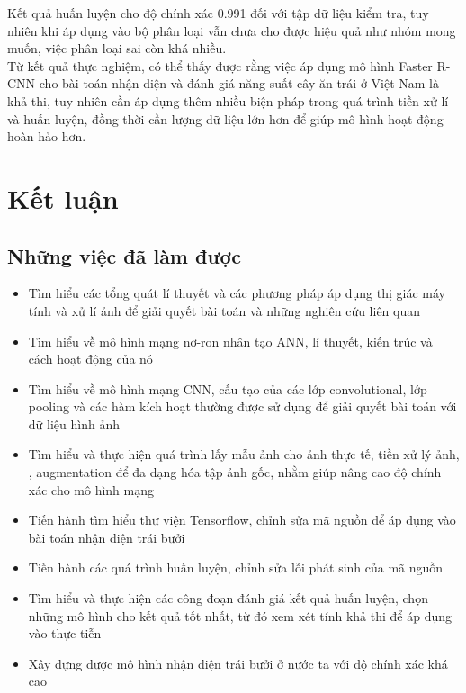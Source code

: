Kết quả huấn luyện cho độ chính xác 0.991 đối với tập dữ liệu kiểm tra, tuy nhiên khi áp dụng vào bộ phân loại vẫn chưa cho được hiệu quả như nhóm mong muốn, việc phân loại sai còn khá nhiều.\\
Từ kết quả thực nghiệm, có thể thấy được rằng việc áp dụng mô hình Faster R-CNN cho bài toán nhận diện và đánh giá năng suất cây ăn trái ở Việt Nam là khả thi, tuy nhiên cần áp dụng thêm nhiều biện pháp trong quá trình tiền xử lí và huấn luyện, đồng thời cần lượng dữ liệu lớn hơn để giúp mô hình hoạt động hoàn hảo hơn.
\section{Kết luận}
\subsection{Những việc đã làm được}
\begin{itemize}
\item Tìm hiểu các tổng quát lí thuyết và các phương pháp áp dụng thị giác máy tính và xử lí ảnh để giải quyết bài toán và những nghiên cứu liên quan

\item Tìm hiểu về mô hình mạng nơ-ron nhân tạo ANN, lí thuyết, kiến trúc và cách hoạt động của nó

\item Tìm hiểu về mô hình mạng CNN, cấu tạo của các lớp convolutional, lớp pooling và các hàm kích hoạt thường được sử dụng để giải quyết bài toán với dữ liệu hình ảnh

\item Tìm hiểu và thực hiện quá trình lấy mẫu ảnh cho ảnh thực tế, tiền xử lý ảnh, , augmentation để đa dạng hóa tập ảnh gốc, nhằm giúp nâng cao độ chính xác cho mô hình mạng

\item Tiến hành tìm hiểu thư viện Tensorflow, chỉnh sửa mã nguồn để áp dụng vào bài toán nhận diện trái bưởi

\item Tiến hành các quá trình huấn luyện, chỉnh sửa lỗi phát sinh của mã nguồn

\item Tìm hiểu và thực hiện các công đoạn đánh giá kết quả huấn luyện, chọn những mô hình cho kết quả tốt nhất, từ đó xem xét tính khả thi để áp dụng vào thực tiễn

\item Xây dựng được mô hình nhận diện trái bưởi ở nước ta với độ chính xác khá cao

\end{itemize}

